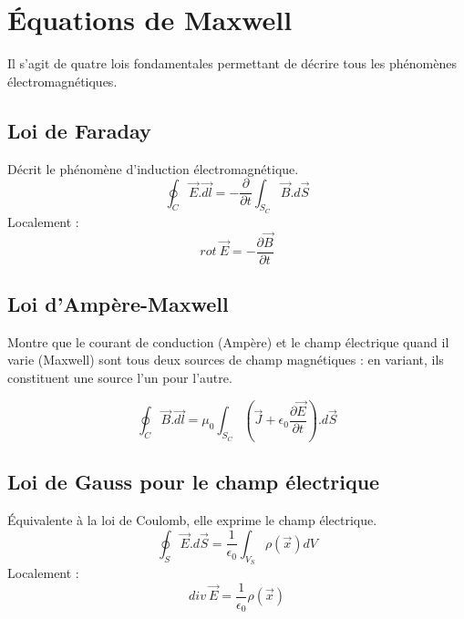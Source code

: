 \documentclass	[11pt, a4paper, openany]{book}
\begin{document}
\section{Équations de Maxwell}
Il s'agit de quatre lois fondamentales permettant de décrire tous les phénomènes électromagnétiques.

\subsection{Loi de Faraday}
Décrit le phénomène d'induction électromagnétique.
\begin{equation}
\oint_C \vec{E}.\vec{dl} = -\frac{\partial}{\partial t} \int_{S_C} \vec{B}.d\vec{S}
\end{equation}
Localement :
\begin{equation}
rot\ \vec{E} = -\frac{\partial\vec{B}}{\partial t}
\end{equation}

\subsection{Loi d'Ampère-Maxwell}
Montre que le courant de conduction (Ampère) et le champ électrique quand il varie (Maxwell) sont tous deux sources de champ magnétiques : en variant, ils constituent une source l'un pour l'autre.

\begin{equation}
\oint_C \vec{B}.\vec{dl} = \mu_0   \int_{S_C}\left(\vec{J} + \epsilon_0 \frac{\partial \vec{E}}{\partial t}\right).d\vec{S}
\end{equation}

\subsection{Loi de Gauss pour le champ électrique}
Équivalente à la loi de Coulomb, elle exprime le champ électrique.
\begin{equation}
\oint_S \vec{E}.d\vec{S} = \frac{1}{\epsilon_0}\int_{V_S} \rho(\vec{x})dV
\end{equation}
Localement :
\begin{equation}
div\ \vec{E} = \frac{1}{\epsilon_0}\rho(\vec{x})
\end{equation}
\end{document}
